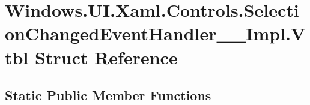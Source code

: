 \hypertarget{struct_windows_1_1_u_i_1_1_xaml_1_1_controls_1_1_selection_changed_event_handler_____impl_1_1_vtbl}{}\section{Windows.\+U\+I.\+Xaml.\+Controls.\+Selection\+Changed\+Event\+Handler\+\_\+\+\_\+\+Impl.\+Vtbl Struct Reference}
\label{struct_windows_1_1_u_i_1_1_xaml_1_1_controls_1_1_selection_changed_event_handler_____impl_1_1_vtbl}
\subsection*{Static Public Member Functions}
